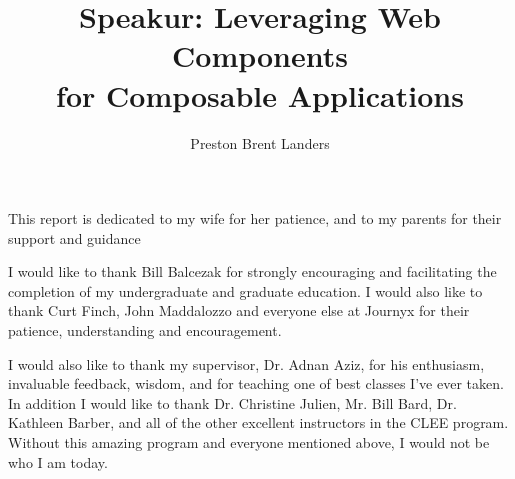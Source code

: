 \documentclass[12pt]{report}	%
\author{Preston Brent Landers}  	%
\title{Speakur: Leveraging Web Components \\ for Composable Applications}
\theoremstyle{definition}
\theoremstyle{remark}
\begin{document}
\copyrightpage          %


%
%
%
\commcertpage           %

\titlepage              %



%
\begin{dedication}
%
This report is dedicated to my wife for her patience,\linebreak
and to my parents for their support and guidance
\end{dedication}


\begin{acknowledgments}		%
%
I would like to thank Bill Balcezak for strongly encouraging and facilitating the completion of my undergraduate and graduate education. 
I would also like to thank Curt Finch, John Maddalozzo and everyone else at Journyx for their patience, understanding and encouragement.

I would also like to thank my supervisor, Dr. Adnan Aziz, 
for his enthusiasm, invaluable feedback, wisdom, and for teaching one of best classes I've ever taken.
In addition I would like to thank Dr. Christine Julien, Mr. Bill Bard, Dr. Kathleen Barber, and all of the other excellent instructors in the CLEE program.
Without this amazing program and everyone mentioned above, I would not be who I am today.
\end{acknowledgments}


%
\utabstract
{}%
\indent
\end{document}
